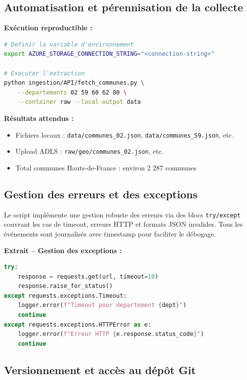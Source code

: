 \documentclass[12pt,a4paper]{article}
\begin{document}
\subsection{Automatisation et pérennisation de la collecte}

\textbf{Exécution reproductible :}

\begin{lstlisting}[language=bash]
# Definir la variable d'environnement
export AZURE_STORAGE_CONNECTION_STRING="<connection-string>"

# Executer l'extraction
python ingestion/API/fetch_communes.py \
    --departements 02 59 60 62 80 \
    --container raw --local-output data
\end{lstlisting}

\textbf{Résultats attendus :}
\begin{itemize}
    \item Fichiers locaux : \texttt{data/communes\_02.json}, \texttt{data/communes\_59.json}, etc.
    \item Upload ADLS : \texttt{raw/geo/communes\_02.json}, etc.
    \item Total communes Hauts-de-France : environ 2 287 communes
\end{itemize}

\subsection{Gestion des erreurs et des exceptions}

Le script implémente une gestion robuste des erreurs via des blocs \texttt{try/except} couvrant les cas de timeout, erreurs HTTP et formats JSON invalides. Tous les événements sont journalisés avec timestamp pour faciliter le débogage.

\textbf{Extrait -- Gestion des exceptions :}

\begin{lstlisting}[language=Python]
try:
    response = requests.get(url, timeout=10)
    response.raise_for_status()
except requests.exceptions.Timeout:
    logger.error(f"Timeout pour departement {dept}")
    continue
except requests.exceptions.HTTPError as e:
    logger.error(f"Erreur HTTP {e.response.status_code}")
    continue
\end{lstlisting}

\subsection{Versionnement et accès au dépôt Git}
\end{document}
